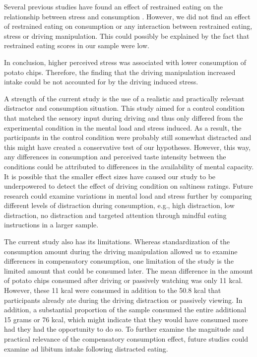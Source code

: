 \documentclass[authordate, empirical, issue]{jote-new-article}
\begin{document}
Several previous studies have found an effect of restrained eating on the relationship between stress and consumption \parencites{Wallis2004}{Wallis2009}. However, we did not find an effect of restrained eating on consumption or any interaction between restrained eating, stress or driving manipulation. This could possibly be explained by the fact that restrained eating scores in our sample were low.



In conclusion, higher perceived stress was associated with lower consumption of potato chips. Therefore, the finding that the driving manipulation increased intake could be not accounted for by the driving induced stress.



A strength of the current study is the use of a realistic and practically relevant distractor and consumption situation. This study aimed for a control condition that matched the sensory input during driving and thus only differed from the experimental condition in the mental load and stress induced. As a result, the participants in the control condition were probably still somewhat distracted and this might have created a conservative test of our hypotheses. However, this way, any differences in consumption and perceived taste intensity between the conditions could be attributed to differences in the availability of mental capacity. It is possible that the smaller effect sizes have caused our study to be underpowered to detect the effect of driving condition on saltiness ratings. Future research could examine variations in mental load and stress further by comparing different levels of distraction during consumption, e.g., high distraction, low distraction, no distraction and targeted attention through mindful eating instructions in a larger sample.



The current study also has its limitations. Whereas standardization of the consumption amount during the driving manipulation allowed us to examine differences in compensatory consumption, one limitation of the study is the limited amount that could be consumed later. The mean difference in the amount of potato chips consumed after driving or passively watching was only 11 kcal. However, these 11 kcal were consumed in addition to the 50.8 kcal that participants already ate during the driving distraction or passively viewing. In addition, a substantial proportion of the sample consumed the entire additional 15 grams or 76 kcal, which might indicate that they would have consumed more had they had the opportunity to do so. To further examine the magnitude and practical relevance of the compensatory consumption effect, future studies could examine ad libitum intake following distracted eating.
\end{document}
